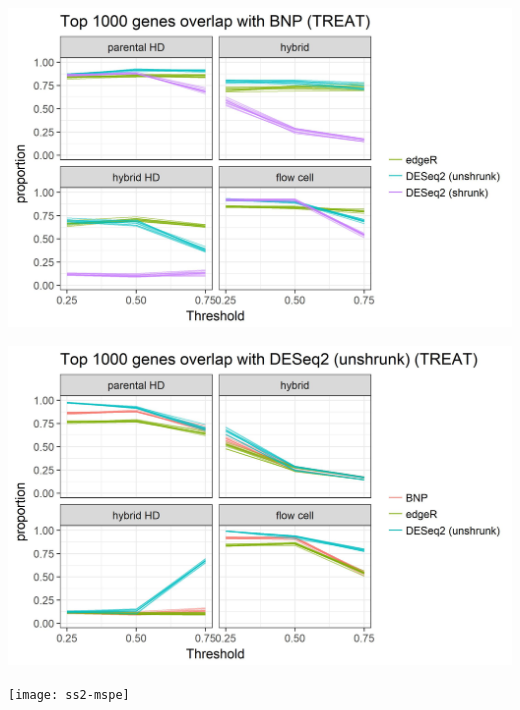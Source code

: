 \documentclass[handout]{beamer}
\begin{document}
\begin{frame}%
  \includegraphics[width=\textwidth]{overlap-ss2-bnp}
\end{frame}

\begin{frame}%
  \includegraphics[width=\textwidth]{overlap-ss2-deseq}
\end{frame}

\begin{frame}%
  \texttt{[image: ss2-mspe]}
\end{frame}
\end{document}
